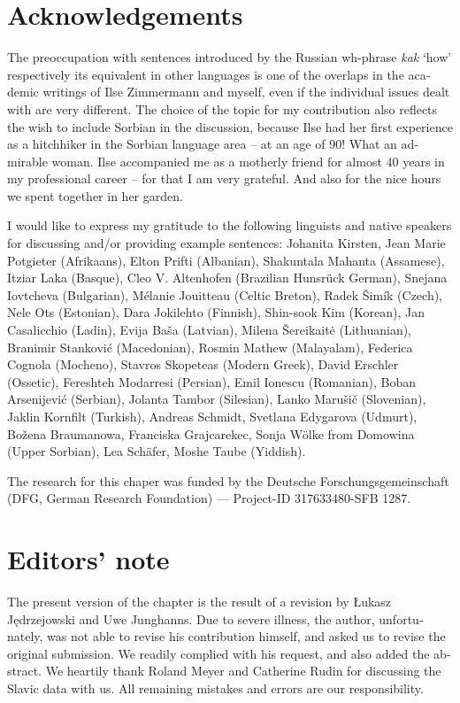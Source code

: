 \documentclass[output=paper,colorlinks,citecolor=brown]{langscibook}
\begin{document}
\begin{otherlanguage}{english}

\section*{Acknowledgements}

The preoccupation with sentences introduced by the Russian wh-phrase \textit{kak} ‘how' respectively its equivalent in other languages is one of the overlaps in the academic writings of Ilse Zimmermann and myself, even if the individual issues dealt with are very different. The choice of the topic for my contribution also reflects the wish to include Sorbian in the discussion, because Ilse had her first experience as a hitchhiker in the Sorbian language area -- at an age of 90! What an admirable woman. Ilse accompanied me as a motherly friend for almost 40 years in my professional career -- for that I am very grateful. And also for the nice hours we spent together in her garden.

I would like to express my gratitude to the following linguists and native speakers for discussing and/or providing example sentences: Johanita Kirsten, Jean Marie Potgieter (Afrikaans), Elton Prifti (Albanian), Shakuntala Mahanta (Assamese), Itziar Laka (Basque), Cleo V. Altenhofen (Brazilian Hunsrück German), Snejana Iovtcheva (Bulgarian), Mélanie Jouitteau (Celtic Breton), Radek Šimík (Czech), Nele Ots (Estonian), Dara Jokilehto (Finnish), Shin-sook Kim (Korean), Jan Casalicchio (Ladin), Evija Baša (Latvian), Milena Šereikaitė (Lithuanian), Branimir Stanković (Macedonian), Rosmin Mathew (Malayalam), Federica Cognola (Mocheno), Stavros Skopeteas (Modern Greek), David Erschler (Ossetic), Fereshteh Modarresi (Persian), Emil Ionescu (Romanian), Boban Arsenijević (Serbian), Jolanta Tambor (Silesian), Lanko Marušič (Slovenian), Jaklin Kornfilt (Turkish), Andreas Schmidt, Svetlana Edygarova (Udmurt), Božena Braumanowa, Franciska Grajcarekec, Sonja Wölke from Domowina (Upper Sorbian), Lea Schäfer, Moshe Taube (Yiddish).


The research for this chaper was funded by the Deutsche Forschungsgemeinschaft (DFG, German Research Foundation) — Project-ID 317633480-SFB 1287.
\section*{Editors' note}
The present version of the chapter is the result of a revision by Łukasz Jędrzejowski and Uwe Junghanns. Due to severe illness, the author, unfortunately, was not able to revise his contribution himself, and asked us to revise the original submission. We readily complied with his request, and also added the abstract. We heartily thank Roland Meyer and Catherine Rudin for discussing the Slavic data with us. All remaining mistakes and errors are our responsibility.

\DeclareRobustCommand{\VAN}[3]{#3}
\printbibliography[heading=subbibliography,notkeyword=this]

\end{otherlanguage}
\end{document}
